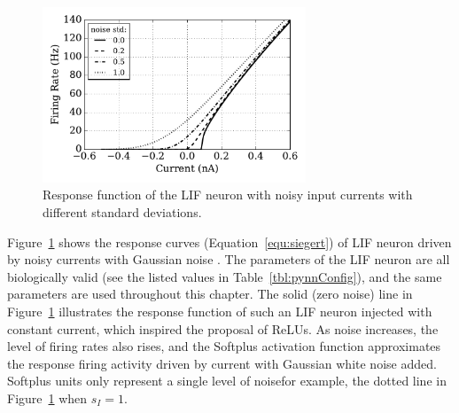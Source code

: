 	
	\begin{figure}[bt]
		\centering
		\includegraphics[width=0.7\textwidth]{pics_iconip/1.pdf}
		\caption{Response function of the LIF neuron with noisy input currents with different standard deviations.}
		\label{Fig:physics}
	\end{figure}

	Figure~\ref{Fig:physics} shows the response curves (Equation~\ref{equ:siegert}) of \DIFdelbegin {}\DIFdelend \DIFaddbegin {}\DIFaddend LIF neuron driven by noisy currents with Gaussian noise \DIFdelbegin {}\DIFdelend \DIFaddbegin {}\DIFaddend .
	The parameters of the LIF neuron are all biologically valid (see the listed values in Table~\ref{tbl:pynnConfig}), and the same parameters are used throughout this chapter.
	The solid (zero noise) line in Figure~\ref{Fig:physics} illustrates the response function of such an LIF neuron injected with constant current, which inspired the proposal of ReLUs.
	As noise increases, the level of firing rates also rises, and the Softplus activation function approximates the response firing activity driven by current with Gaussian white noise added.
	Softplus units only represent a single level of noise\DIFdelbegin {}\DIFdelend \DIFaddbegin \DIFadd{; }\DIFaddend for example, the dotted line in Figure~\ref{Fig:physics} \DIFdelbegin {}\DIFdelend \DIFaddbegin {}\DIFaddend when $s_I=1$.

